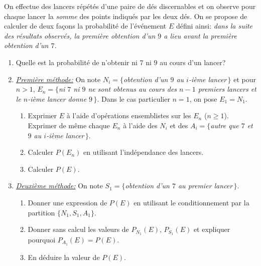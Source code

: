 \documentclass[a4paper,12pt,reqno]{amsart}
\begin{document}
\begin{exo}

  On effectue des lancers répétés d'une paire de dés discernables et on observe pour
  chaque lancer la \emph{somme} des points indiqués par les deux dés. On se
  propose de calculer de deux façons la probabilité de l'événement $E$ défini
  ainsi: \emph{dans la suite des résultats observés, la première obtention d'un
  $9$ a lieu avant la première obtention d'un $7$.}

  \begin{enumerate}
    \item  Quelle est la probabilité de n'obtenir ni $7$ ni $9$ au cours d'un lancer?
    \item \underline{\emph{Première méthode:}} On note $N_i=\{$\emph{obtention d'un $9$ au $i$-ième lancer\,}$\}$ et pour $n>1$, $E_n=\{$\emph{ni $7$ ni $9$ ne sont obtenus au cours des $n-1$ premiers lancers et le $n$-ième lancer donne $9$\,}$\}$. Dans le cas particulier $n=1$, on pose $E_1=N_1$.
      \begin{enumerate}
        \item Exprimer $E$ à l'aide d'opérations ensemblistes sur les $E_n$ ($n\geq 1$). Exprimer de même chaque $E_n$ à l'aide  des $N_i$ et des  $A_i=\{$\emph{autre que $7$ et $9$ au $i$-ième lancer\,}$\}$.
        \item Calculer $P(E_n)$ en utilisant l'indépendance des lancers.
        \item Calculer $P(E)$.
      \end{enumerate}
    \item \underline{\emph{Deuxième méthode:}}  On note $S_1=\{$\emph{obtention d'un $7$ au premier lancer\,}$\}$.
      \begin{enumerate}
        \item Donner une expression de $P(E)$ en utilisant le conditionnement par la partition $\{N_1,S_1,A_1\}$.
        \item Donner sans calcul les valeurs de $P_{N_1}(E)$, $P_{S_1}(E)$ et expliquer pourquoi $P_{A_1}(E)=P(E)$.
        \item En déduire la valeur de $P(E)$.
      \end{enumerate}
  \end{enumerate}

\end{exo}
\end{document}
